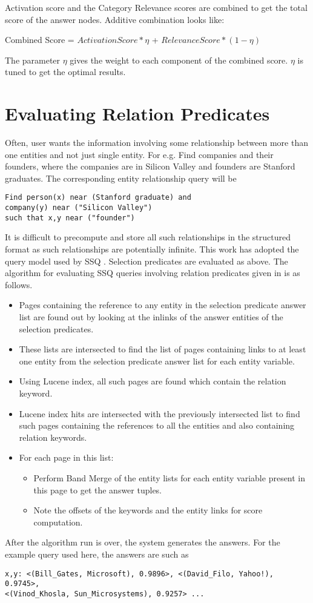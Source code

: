 \documentclass[11pt]{report}
\begin{document}
Activation score and the Category Relevance scores are combined to get the total score of the answer nodes. Additive combination looks like:
\begin{center}
 Combined Score = $Activation Score * \eta$ + $RelevanceScore * (1-\eta)$
\end{center}
The parameter $\eta$ gives the weight to each component of the combined score. $\eta$ is tuned to get the optimal results. 

\section{Evaluating Relation Predicates}
  Often, user wants the information involving some relationship between more than one entities and not just single entity.
For e.g. Find companies and their founders, where the companies are in Silicon Valley and founders are Stanford graduates.
The corresponding entity relationship query will be
\begin{verbatim}
Find person(x) near (Stanford graduate) and 
company(y) near ("Silicon Valley")
such that x,y near ("founder")
\end{verbatim}
It is difficult to precompute and store all such relationships in the structured format as such relationships are
potentially infinite. This work has adopted the query model used by SSQ \cite{ssq}. Selection predicates are evaluated
as above. The algorithm for evaluating SSQ queries involving relation predicates given in \cite{wikibanks} is as follows. 
\begin{itemize}
 \item Pages containing the reference to any entity in the selection predicate answer list are found out by looking at the
inlinks of the answer entities of the selection predicates.
 \item These lists are intersected to find the list of pages containing links to at least one entity from the selection predicate
answer list for each entity variable.
 \item Using Lucene index, all such pages are found which contain the relation keyword.
 \item Lucene index hits are intersected with the previously intersected list to find such pages containing the references to all the entities
and also containing relation keywords.
 \item For each page in this list:
    \begin{itemize}
      \item Perform Band Merge of the entity lists for each entity variable present in this page to get the answer tuples. 
      \item Note the offsets of the keywords and the entity links for score computation. 
    \end{itemize}
\end{itemize}
  After the algorithm run is over, the system generates the answers. For the example query used here, the answers are such as
\begin{verbatim}
x,y: <(Bill_Gates, Microsoft), 0.9896>, <(David_Filo, Yahoo!), 0.9745>, 
<(Vinod_Khosla, Sun_Microsystems), 0.9257> ...
\end{verbatim}
\end{document}
